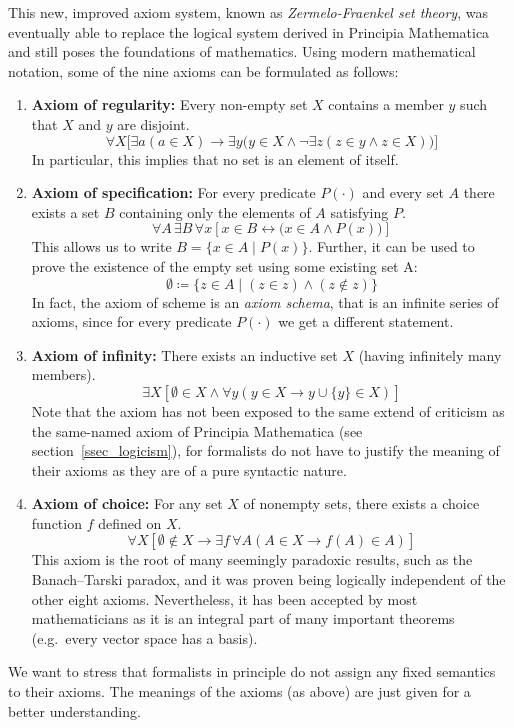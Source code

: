 \documentclass[hidelinks]{article}
\begin{document}
This new, improved axiom system, known as \textit{Zermelo-Fraenkel set theory}, was eventually able to replace the logical system derived in Principia Mathematica and still poses the foundations of mathematics. Using modern mathematical notation, some of the nine axioms can be formulated as follows:
\small
\begin{enumerate}
    \item \textbf{Axiom of regularity:} Every non-empty set $X$ contains a member $y$ such that $X$ and $y$ are disjoint.
\begin{equation*}
\forall X \bigl[\exists a ( a \in X) \rightarrow \exists y \bigl( y \in X \land \lnot \exists z (z \in y \land z \in X)\bigr)\bigr]
\end{equation*}
In particular, this implies that no set is an element of itself.
    \item \textbf{Axiom of specification:} For every predicate $P(\cdot)$ and every set $A$ there exists a set $B$ containing only the elements of $A$ satisfying $P$.
\begin{equation*}
\forall A\,\exists B\,\forall x[x\in B \leftrightarrow \bigl(x\in A \land P(x)\bigr)]
\end{equation*}
This allows us to write $B=\{x\in A\mid P(x)\}$. Further, it can be used to prove the existence of the empty set using some existing set A:
\begin{equation*}
\emptyset\coloneqq\{z\in A\mid (z\in z)\land(z\notin z)\}
\end{equation*}
In fact, the axiom of scheme is an \textit{axiom schema}, that is an infinite series of axioms, since for every predicate $P(\cdot)$ we get a different statement.
    \item \textbf{Axiom of infinity:} There exists an inductive set $X$ (having infinitely many members).
\begin{equation*}
\exists X \left [\emptyset \in X \land \forall y (y \in X \rightarrow y\cup\{y\}  \in X)\right]
\end{equation*}
Note that the axiom has not been exposed to the same extend of criticism as the same-named axiom of Principia Mathematica (see section~\ref{ssec_logicism}), for formalists do not have to justify the meaning of their axioms as they are of a pure syntactic nature.
    \item \textbf{Axiom of choice:} For any set $X$ of nonempty sets, there exists a choice function $f$ defined on $X$. 
\begin{equation*}
\forall X \left[ \emptyset \notin X \rightarrow \exists f\,\forall A(A\in X\rightarrow f(A) \in A ) \right]
\end{equation*}
This axiom is the root of many seemingly paradoxic results, such as the Banach–Tarski paradox, and it was proven being logically independent of the other eight axioms. Nevertheless, it has been accepted by most mathematicians as it is an integral part of many important theorems (e.g.\ every vector space has a basis).
\end{enumerate}
\normalsize
We want to stress that formalists in principle do not assign any fixed semantics to their axioms. The meanings of the axioms (as above) are just given for a better understanding.
\end{document}
